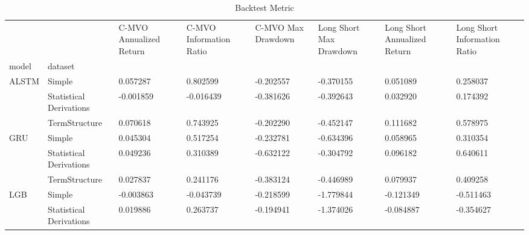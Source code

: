 \documentclass[10pt,letterpaper]{article}
\begin{document}
\begin{table}[!ht]
\begin{adjustwidth}{-2.25in}{0in} %
\centering
\caption{Backtest Metric}
\begin{tabular}{llp{2cm}p{2cm}p{2cm}p{2cm}p{2cm}p{2cm}}
\toprule
    &               &  C-MVO Annualized Return &  C-MVO Information Ratio &  C-MVO Max Drawdown &  Long Short Max Drawdown &  Long Short Annualized Return &  Long Short Information Ratio \\
model & dataset &                          &                          &                     &                          &                               &                               \\
\midrule
ALSTM & Simple &                 0.057287 &                 0.802599 &           -0.202557 &                -0.370155 &                      0.051089 &                      0.258037 \\
    & Statistical Derivations &                -0.001859 &                -0.016439 &           -0.381626 &                -0.392643 &                      0.032920 &                      0.174392 \\
    & TermStructure &                 0.070618 &                 0.743925 &           -0.202290 &                -0.452147 &                      0.111682 &                      0.578975 \\
GRU & Simple &                 0.045304 &                 0.517254 &           -0.232781 &                -0.634396 &                      0.058965 &                      0.310354 \\
    & Statistical Derivations &                 0.049236 &                 0.310389 &           -0.632122 &                -0.304792 &                      0.096182 &                      0.640611 \\
    & TermStructure &                 0.027837 &                 0.241176 &           -0.383124 &                -0.446989 &                      0.079937 &                      0.409258 \\
LGB & Simple &                -0.003863 &                -0.043739 &           -0.218599 &                -1.779844 &                     -0.121349 &                     -0.511463 \\
    & Statistical Derivations &                 0.019886 &                 0.263737 &           -0.194941 &                -1.374026 &                     -0.084887 &                     -0.354627 \\

\end{tabular}
\end{adjustwidth}
\end{table}
\end{document}
